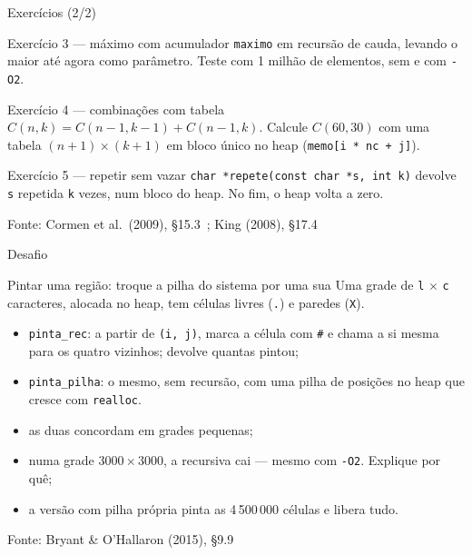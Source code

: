 \documentclass[aspectratio=169]{beamer}
\newcommand{\fonte}[1]{\vfill\hfill{\scriptsize\textcolor{UFSGray}{Fonte: #1}}}
\begin{document}
\begin{frame}{Exercícios (2/2)}
  \footnotesize
  \begin{block}{Exercício 3 --- máximo com acumulador}
    \texttt{maximo} em recursão de cauda, levando o maior até agora como
    parâmetro. Teste com 1 milhão de elementos, sem e com \texttt{-O2}.
  \end{block}
  \begin{block}{Exercício 4 --- combinações com tabela}
    $C(n,k) = C(n-1,k-1) + C(n-1,k)$. Calcule $C(60, 30)$ com uma tabela
    $(n+1) \times (k+1)$ em bloco único no heap (\texttt{memo[i * nc + j]}).
  \end{block}
  \begin{block}{Exercício 5 --- repetir sem vazar}
    \texttt{char *repete(const char *s, int k)} devolve \texttt{s} repetida
    \texttt{k} vezes, num bloco do heap. No fim, o heap volta a zero.
  \end{block}
  \fonte{Cormen et al.\ (2009), §15.3~\cite{cormen2009introduction};
    King (2008), §17.4~\cite{king2008c}}
\end{frame}

\begin{frame}{Desafio}
  \begin{block}{Pintar uma região: troque a pilha do sistema por uma sua}
    \small Uma grade de \texttt{l} $\times$ \texttt{c} caracteres, alocada
    no heap, tem células livres (\texttt{.}) e paredes (\texttt{X}).
    \begin{itemize}
      \item \texttt{pinta\_rec}: a partir de \texttt{(i, j)}, marca a célula
        com \texttt{\#} e chama a si mesma para os quatro vizinhos; devolve
        quantas pintou;
      \item \texttt{pinta\_pilha}: o mesmo, sem recursão, com uma pilha de
        posições no heap que cresce com \texttt{realloc}.
    \end{itemize}
    \begin{itemize}
      \item as duas concordam em grades pequenas;
      \item numa grade $3000 \times 3000$, a recursiva cai --- mesmo com
        \texttt{-O2}. Explique por quê;
      \item a versão com pilha própria pinta as 4\,500\,000 células e
        libera tudo.
    \end{itemize}
  \end{block}
  \fonte{Bryant \& O'Hallaron (2015), §9.9~\cite{bryant2015computer}}
\end{frame}
\end{document}
